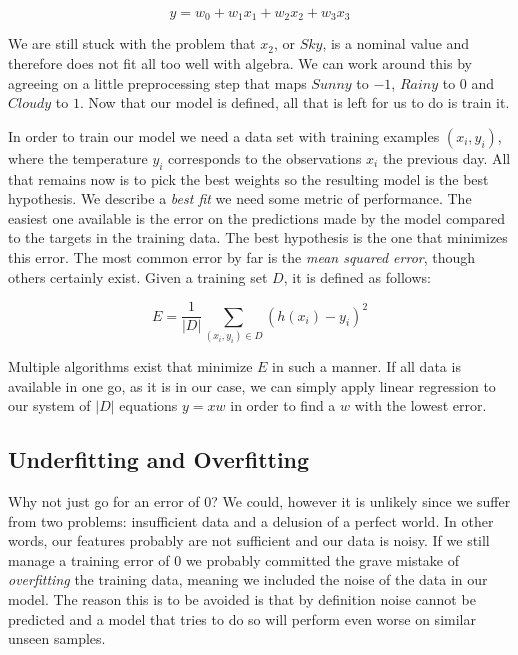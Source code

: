 $$ y = w_0 + w_1x_1 + w_2x_2 + w_3x_3 $$

We are still stuck with the problem that $x_2$, or $Sky$,
is a nominal value and therefore does not fit all too well with algebra.
We can work around this by agreeing on
a little preprocessing step
that maps $Sunny$ to $-1$, $Rainy$ to $0$ and $Cloudy$ to $1$.
Now that our model is defined, all that is left for us to do
is train it.

In order to train our model we need a data set with training examples
$(x_i, y_i)$,
where the temperature $y_i$ corresponds to
the observations $x_i$ the previous day.
All that remains now is to pick the best weights
so the resulting model is the best hypothesis.
We describe a \textit{best fit}
we need some metric of performance.
The easiest one available is the error on the predictions made by the model
compared to the targets in the training data.
The best hypothesis is the one that minimizes this error.
The most common error by far is the \textit{mean squared error},
though others certainly exist.
Given a training set $D$, it is defined as follows:

$$ E = \frac{1}{|D|} \sum_{(x_i, y_i) \in D}{(h(x_i) - y_i)^2} $$

Multiple algorithms exist that minimize $E$ in such a manner.
If all data is available in one go, as it is in our case,
we can simply apply linear regression to our system
of $|D|$ equations $y = xw$ in order to find a $w$
with the lowest error.

\subsection{Underfitting and Overfitting}
Why not just go for an error of $0$?
We could, however it is unlikely since we suffer from two problems:
insufficient data and a delusion of a perfect world.
In other words, our features probably are not sufficient
and our data is noisy.
If we still manage a training error of $0$
we probably committed the grave mistake of
\textit{overfitting} the training data,
meaning we included the noise of the data in our model.
The reason this is to be avoided is that by definition
noise cannot be predicted and a model that tries
to do so will perform even worse on similar unseen samples.

